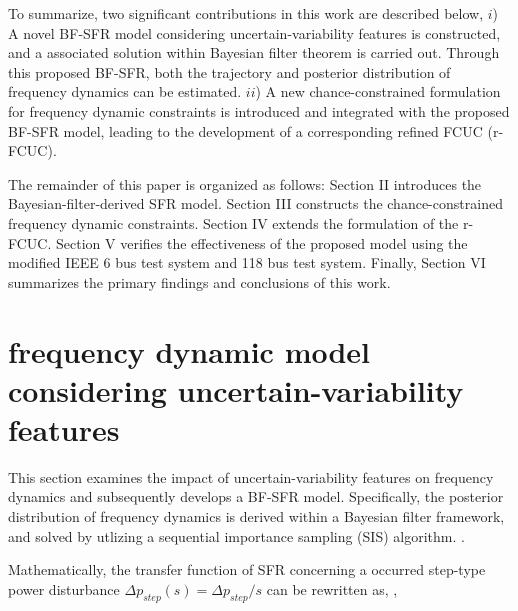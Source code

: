 \documentclass[lettersize,journal]{IEEEtran}
\begin{document}
To summarize, two significant contributions in this work are described below, $i$) A novel BF-SFR model considering uncertain-variability features is constructed, and a associated solution within Bayesian filter theorem is carried out. Through this proposed BF-SFR, both the trajectory and posterior distribution of frequency dynamics can be estimated. $ii$) A new chance-constrained formulation for frequency dynamic constraints is introduced and integrated with the proposed BF-SFR model, leading to the development of a corresponding refined FCUC (r-FCUC).
	
The remainder of this paper is organized as follows: Section II introduces the Bayesian-filter-derived SFR model. Section III constructs the chance-constrained frequency dynamic constraints. Section IV extends the formulation of the r-FCUC. Section V verifies the effectiveness of the proposed model using the modified IEEE 6 bus test system and 118 bus test system. Finally, Section VI summarizes the primary findings and conclusions of this work.

\vspace{-0.025in} 

\section{frequency dynamic model considering uncertain-variability features}


This section examines the impact of uncertain-variability features on frequency dynamics and subsequently develops a BF-SFR model. Specifically, the posterior distribution of frequency dynamics is derived within a Bayesian filter framework, and solved by utlizing a sequential importance sampling (SIS) algorithm. \cite{yardim2011overview}.

Mathematically, the transfer function of SFR concerning a occurred step-type power disturbance $\varDelta p_{{step }}(s)=\varDelta p_{{step }} / s$ can be rewritten as, \cite{9964327,paturet2020stochastic,10098683,9613814},
\end{document}
